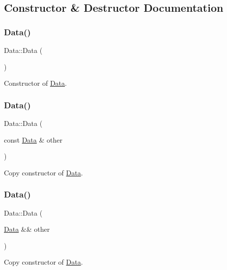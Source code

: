 \subsection{Constructor \& Destructor Documentation}
\mbox{\label{classData_af11f741cb7f587e2e495452a8905a22a}} 
\subsubsection{\texorpdfstring{Data()}{Data()}\hspace{0.1cm}{\footnotesize\ttfamily [1/6]}}
{\footnotesize\ttfamily Data\+::\+Data (\begin{DoxyParamCaption}{ }\end{DoxyParamCaption})}

Constructor of \hyperlink{classData}{Data}. \mbox{\label{classData_a0a6006d6052c8224749bbce584f403ea}} 
\subsubsection{\texorpdfstring{Data()}{Data()}\hspace{0.1cm}{\footnotesize\ttfamily [2/6]}}
{\footnotesize\ttfamily Data\+::\+Data (\begin{DoxyParamCaption}\item[{const \hyperlink{classData}{Data} \&}]{other }\end{DoxyParamCaption})}

Copy constructor of \hyperlink{classData}{Data}. \mbox{\label{classData_a7dcf68b2d1621201be76fe551dc171a3}} 
\subsubsection{\texorpdfstring{Data()}{Data()}\hspace{0.1cm}{\footnotesize\ttfamily [3/6]}}
{\footnotesize\ttfamily Data\+::\+Data (\begin{DoxyParamCaption}\item[{\hyperlink{classData}{Data} \&\&}]{other }\end{DoxyParamCaption})}

Copy constructor of \hyperlink{classData}{Data}. \mbox{\label{classData_aab31956423290f0d62dcca47ab4d16dd}} 
